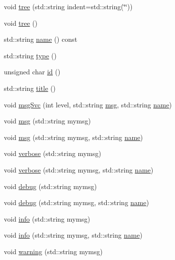 \begin{DoxyCompactItemize}
void \hyperlink{classHierarchy_a76e914b9a677a22a82deb74d892bf261}{tree} (std\+::string indent=std\+::string(\char`\"{}\char`\"{}))
\item 
void \hyperlink{classHierarchy_a594c294c5f60c230e106d522ed008212}{tree} ()
\item 
std\+::string \hyperlink{classObject_a300f4c05dd468c7bb8b3c968868443c1}{name} () const
\item 
std\+::string \hyperlink{classObject_a84f99f70f144a83e1582d1d0f84e4e62}{type} ()
\item 
unsigned char \hyperlink{classObject_af99145335cc61ff6e2798ea17db009d2}{id} ()
\item 
std\+::string \hyperlink{classObject_a73a0f1a41828fdd8303dd662446fb6c3}{title} ()
\item 
void \hyperlink{classObject_a3f9d5537ebce0c0f2bf6ae4d92426f3c}{msg\+Svc} (int level, std\+::string \hyperlink{classObject_a58b2d0618c2d08cf2383012611528d97}{msg}, std\+::string \hyperlink{classObject_a300f4c05dd468c7bb8b3c968868443c1}{name})
\item 
void \hyperlink{classObject_a58b2d0618c2d08cf2383012611528d97}{msg} (std\+::string mymsg)
\item 
void \hyperlink{classObject_ac5d59299273cee27aacf7de00d2e7034}{msg} (std\+::string mymsg, std\+::string \hyperlink{classObject_a300f4c05dd468c7bb8b3c968868443c1}{name})
\item 
void \hyperlink{classObject_a83d2db2df682907ea1115ad721c1c4a1}{verbose} (std\+::string mymsg)
\item 
void \hyperlink{classObject_a2d4120195317e2a3c6532e8bb9f3da68}{verbose} (std\+::string mymsg, std\+::string \hyperlink{classObject_a300f4c05dd468c7bb8b3c968868443c1}{name})
\item 
void \hyperlink{classObject_aac010553f022165573714b7014a15f0d}{debug} (std\+::string mymsg)
\item 
void \hyperlink{classObject_a6c9a0397ca804e04d675ed05683f5420}{debug} (std\+::string mymsg, std\+::string \hyperlink{classObject_a300f4c05dd468c7bb8b3c968868443c1}{name})
\item 
void \hyperlink{classObject_a644fd329ea4cb85f54fa6846484b84a8}{info} (std\+::string mymsg)
\item 
void \hyperlink{classObject_a1ca123253dfd30fc28b156f521dcbdae}{info} (std\+::string mymsg, std\+::string \hyperlink{classObject_a300f4c05dd468c7bb8b3c968868443c1}{name})
\item 
void \hyperlink{classObject_a65cd4fda577711660821fd2cd5a3b4c9}{warning} (std\+::string mymsg)

\end{DoxyCompactItemize}
